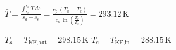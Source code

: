 \(\bar{T} = \frac{\int_{s_e}^{s_a} T \, ds}{s_a - s_e} = \frac{c_p \, (T_a - T_e)}{c_p \, \ln \left( \frac{T_a}{T_e} \right)} = 293.12 \, \text{K}\)  

\(T_a = T_{\text{KF,out}} = 298.15 \, \text{K}\)  
\(T_e = T_{\text{KF,in}} = 288.15 \, \text{K}\)